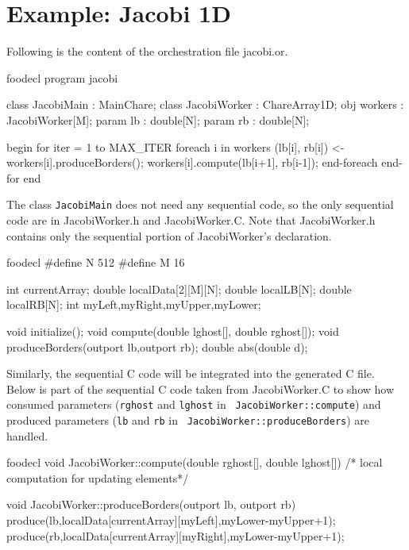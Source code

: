 \section{Example: Jacobi 1D}
Following is the content of the orchestration file jacobi.or. 

\begin{SaveVerbatim}{foodecl}
program jacobi

class  JacobiMain : MainChare;
class  JacobiWorker : ChareArray1D;
obj  workers : JacobiWorker[M];
param  lb : double[N];
param  rb : double[N];

begin
    for iter = 1 to MAX_ITER
	foreach i in workers
	    (lb[i], rb[i]) <- workers[i].produceBorders();
	    workers[i].compute(lb[i+1], rb[i-1]);
	end-foreach
    end-for
end
\end{SaveVerbatim}
\vspace{0.1in}
\vspace{0.1in}

The class {\tt JacobiMain} does not need any sequential code, so the only
sequential code are in JacobiWorker.h and JacobiWorker.C. Note that
JacobiWorker.h contains only the sequential portion of JacobiWorker's
declaration. 

\begin{SaveVerbatim}{foodecl}
#define N 512
#define M 16

int currentArray;	
double localData[2][M][N]; 
double localLB[N];
double localRB[N];
int myLeft,myRight,myUpper,myLower;

void initialize();
void compute(double lghost[], double rghost[]);
void produceBorders(outport lb,outport rb);
double abs(double d);
\end{SaveVerbatim}
\vspace{0.1in}
\vspace{0.1in}

Similarly, the sequential C code will be integrated into the generated C file.
Below is part of the sequential C code taken from JacobiWorker.C to show how
consumed parameters ({\tt rghost} and {\tt lghost} in {\tt
JacobiWorker::compute}) and produced parameters ({\tt lb} and {\tt rb} in {\tt
JacobiWorker::produceBorders}) are handled.

\begin{SaveVerbatim}{foodecl}
void JacobiWorker::compute(double rghost[], double lghost[]){
    /* local computation for updating elements*/
}

void JacobiWorker::produceBorders(outport lb, outport rb){
    produce(lb,localData[currentArray][myLeft],myLower-myUpper+1);
    produce(rb,localData[currentArray][myRight],myLower-myUpper+1);
}
\end{SaveVerbatim}
\vspace{0.1in}
\vspace{0.1in}

